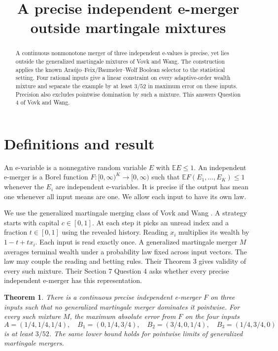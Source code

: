 \documentclass[11pt,a4paper]{amsart}
\title{A precise independent e-merger outside martingale mixtures}
\date{}
\newtheorem{theorem}{Theorem}
\begin{document}
\begin{abstract}
A continuous nonmonotone merger of three independent e-values is precise,
yet lies outside the generalized martingale mixtures of Vovk and Wang.
The construction applies the known Ara\'ujo--Feix/Baumeler--Wolf Boolean
selector to the statistical setting. Four rational inputs give a linear
constraint on every adaptive-order wealth mixture and separate the
example by at least \(3/52\) in maximum error on these inputs.
Precision also excludes pointwise domination by such a mixture.
This answers Question 4 of Vovk and Wang.
\end{abstract}
\maketitle

\section{Definitions and result}

An e-variable is a nonnegative random variable \(E\) with
\(\mathbb E E\leq1\). An independent e-merger is a Borel function
\(F:[0,\infty)^K\to[0,\infty)\) such that
\(\mathbb E F(E_1,\ldots,E_K)\leq1\) whenever the \(E_i\) are independent
e-variables. It is precise if the output has mean one whenever all
input means are one. We allow each input to have its own law.

We use the generalized martingale merging class of
Vovk and Wang \cite[\S6, eqs.~(18)--(19)]{vw}.
A strategy starts with capital \(c\in[0,1]\).
At each step it picks an unread index and a fraction \(t\in[0,1]\)
using the revealed history. Reading \(x_i\) multiplies its wealth
by \(1-t+tx_i\). Each input is read exactly once.
A generalized martingale merger \(M\) averages terminal wealth under a
probability law fixed across input vectors. The law may couple the
reading and betting rules. Their Theorem 3 gives validity of every
such mixture. Their Section 7 Question 4 asks whether every precise
independent e-merger has this representation.

\begin{theorem}
There is a continuous precise independent e-merger \(F\) on three
inputs such that no generalized martingale merger dominates it
pointwise. For every such mixture \(M\), the maximum absolute
error from \(F\) on the four inputs
\[
 A=(1/4,1/4,1/4),\quad B_1=(0,1/4,3/4),\quad
 B_2=(3/4,0,1/4),\quad B_3=(1/4,3/4,0)
\]
is at least \(3/52\). The same lower bound holds for pointwise limits
of generalized martingale mergers.
\end{theorem}
\end{document}
